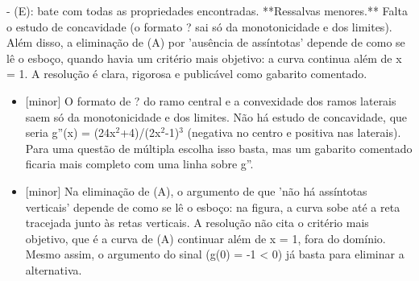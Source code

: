 \documentclass{article}%
\begin{document}
{-} (E): bate com todas as propriedades encontradas.\newline%
\newline%
**Ressalvas menores.** Falta o estudo de concavidade (o formato ? sai só da monotonicidade e dos limites). Além disso, a eliminação de (A) por 'ausência de assíntotas' depende de como se lê o esboço, quando havia um critério mais objetivo: a curva continua além de x = 1. A resolução é clara, rigorosa e publicável como gabarito comentado.%
\begin{itemize}%
\item%
{[}minor{]} O formato de ? do ramo central e a convexidade dos ramos laterais saem só da monotonicidade e dos limites. Não há estudo de concavidade, que seria g''(x) = (24x$^2$+4)/(2x$^2$-1)$^3$ (negativa no centro e positiva nas laterais). Para uma questão de múltipla escolha isso basta, mas um gabarito comentado ficaria mais completo com uma linha sobre g''.%
\item%
{[}minor{]} Na eliminação de (A), o argumento de que 'não há assíntotas verticais' depende de como se lê o esboço: na figura, a curva sobe até a reta tracejada junto às retas verticais. A resolução não cita o critério mais objetivo, que é a curva de (A) continuar além de x = 1, fora do domínio. Mesmo assim, o argumento do sinal (g(0) = -1 < 0) já basta para eliminar a alternativa.%
\end{itemize}%
\end{document}
